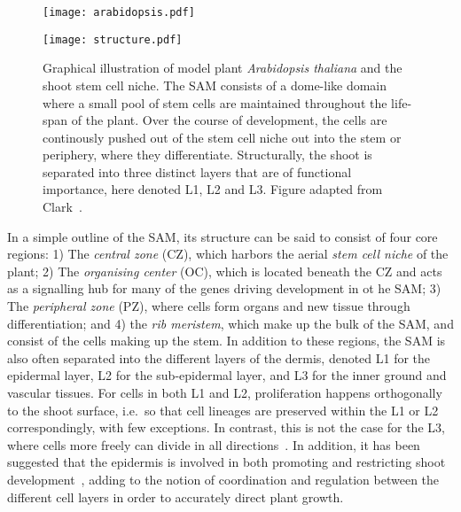 \begin{figure}[H]
  \centering
  \begin{minipage}{0.25\textwidth}
    \centering
    \texttt{[image: arabidopsis.pdf]}
  \end{minipage}\hfill
  \begin{minipage}{.75\textwidth}
    \centering
    \texttt{[image: structure.pdf]} %
  \end{minipage}
  \caption[Graphical illustration of \textit{Arabidopsis thaliana} and the
  \textit{Shoot Apical Meristem}]{Graphical illustration of model plant \textit{Arabidopsis
      thaliana} and the shoot stem cell niche. The SAM consists of a
    dome-like domain where a small pool of stem cells are maintained
    throughout the life-span of the plant. Over the course of development,
    the cells are continously pushed out of the stem cell niche out into the
    stem or periphery, where they differentiate. Structurally, the shoot is
    separated into three distinct layers that are of functional
    importance, here denoted L1, L2 and L3. Figure adapted from
    Clark~\cite{clark2001cell}.}
  \label{fig:structure}
\end{figure}

In a simple outline of the SAM, its structure can be said to consist of four core regions:
1) The \textit{central zone} (CZ), which harbors the aerial \textit{stem cell niche} 
of the plant; 2) The \textit{organising center} (OC), which is located beneath
the CZ and acts as a signalling hub for many of the genes driving development in
ot he SAM; 3) The
\textit{peripheral zone} (PZ), where cells form organs and new tissue through
differentiation; and 4) the \textit{rib meristem}, which make up the bulk of the
SAM, and consist of the cells making up the stem. In addition to these regions,
the SAM is also often separated 
into the different layers of the dermis, denoted L1 for the epidermal
layer, L2 for the sub-epidermal layer, and L3 for the inner ground
and vascular tissues. For cells in both L1 and L2, proliferation happens
orthogonally to the shoot surface, i.e.\ so that cell lineages are preserved
within the L1 or L2 correspondingly, with few exceptions. In contrast,
this is not the case for the L3, where 
cells more freely can divide in all directions~\cite{scheres2007stem}. In
addition, it has been suggested
that the epidermis is involved in both promoting and restricting shoot
development~\cite{gruel2016epidermis}, adding to the
notion of coordination and regulation between the different cell layers in order
to accurately direct plant growth. 

